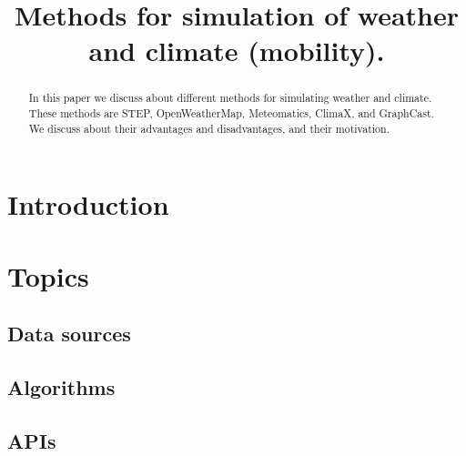 \documentclass[conference]{IEEEtran}
\begin{document}
\title{Methods for simulation of weather and climate
(mobility).\\}

\author{
\and
{}
}

\maketitle

\begin{abstract}
    In this paper we discuss about different methods for simulating weather and climate.
    These methods are STEP, OpenWeatherMap, Meteomatics, ClimaX, and GraphCast.
    We discuss about their advantages and disadvantages, and their motivation.
\end{abstract}

\section{Introduction}\label{sec:introduction}


\section{Topics}\label{sec:topics}

\subsection{Data sources}\label{subsec:data-sources}


\subsection{Algorithms}\label{subsec:algorithm}


\subsection{APIs}\label{subsec:api}

\end{document}
